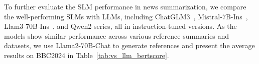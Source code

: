 
To further evaluate the SLM performance in news summarization, we compare the well-performing SLMs with LLMs, including ChatGLM3~\cite{glm2024chatglm}, Mistral-7B-Ins~\cite{jiang2023mistral}, Llam3-70B-Ins~\cite{llama3modelcard}, and Qwen2 series, all in instruction-tuned versions. As the models show similar performance across various reference summaries and datasets, we use Llama2-70B-Chat to generate references and present the average results on BBC2024 in Table~\ref{tab:vs_llm_bertscore}. 


